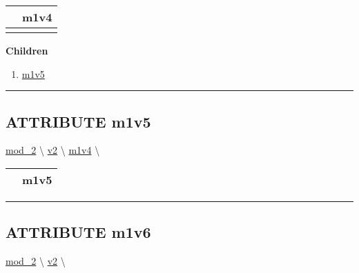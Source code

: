 {\renewcommand{\arraystretch}{1.5}
\begin{tabularx}{\textwidth}{|>{\raggedright\arraybackslash}l|X|}
\hline
\hspace{0pt}\mytexttt{\color{red} } & \textbf{m1v4} \\
\hline
\multicolumn{2}{|>{\raggedright\arraybackslash}X|}{\hspace{0pt}\mytexttt{\color{param} (REAL8 a1)}} \\
\hline
\end{tabularx}
}

\par


\textbf{Children}
\begin{enumerate}
\item \hyperlink{ecldoc:mod_1.m1v4.m1v5}{m1v5}
\end{enumerate}

\rule{\linewidth}{0.5pt}

\subsection*{\textsf{\colorbox{headtoc}{\color{white} ATTRIBUTE}
m1v5}}

\hypertarget{ecldoc:mod_1.m1v4.m1v5}{}
\hspace{0pt} \hyperlink{ecldoc:mod_2}{mod_2} \textbackslash 
\hspace{0pt} \hyperlink{ecldoc:mod_1}{v2} \textbackslash 
\hspace{0pt} \hyperlink{ecldoc:mod_1.m1v4}{m1v4} \textbackslash 

{\renewcommand{\arraystretch}{1.5}
\begin{tabularx}{\textwidth}{|>{\raggedright\arraybackslash}l|X|}
\hline
\hspace{0pt}\mytexttt{\color{red} } & \textbf{m1v5} \\
\hline
\end{tabularx}
}

\par


\rule{\linewidth}{0.5pt}


\subsection*{\textsf{\colorbox{headtoc}{\color{white} ATTRIBUTE}
m1v6}}

\hypertarget{ecldoc:mod_1.m1v6}{}
\hspace{0pt} \hyperlink{ecldoc:mod_2}{mod_2} \textbackslash 
\hspace{0pt} \hyperlink{ecldoc:mod_1}{v2} \textbackslash 

